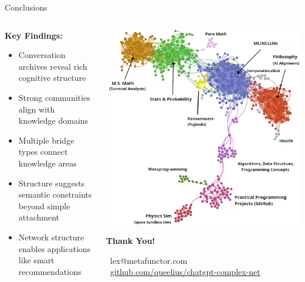 \documentclass[nodes]{beamer}
\begin{document}
\begin{frame}{Conclusions}
  \begin{columns}[T]
    \begin{column}{0.55\textwidth}
      \textbf{Key Findings:}
      \begin{itemize}
        \item Conversation archives reveal rich \alert{cognitive structure}
        \item Strong \alert{communities} align with knowledge domains
        \item Multiple \alert{bridge types} connect knowledge areas
        \item Structure suggests \alert{semantic constraints} beyond simple attachment
        \item Network structure enables applications like smart recommendations
      \end{itemize}
    \end{column}
    
    \begin{column}{0.45\textwidth}
      \begin{center}
        \includegraphics[width=0.7\linewidth]{images/cluster-vis-topics-better.png}
        \vspace{0.5cm}
        
        \textbf{Thank You!}
        \vspace{0.3cm}
        
        \scriptsize
        \faEnvelope~lex@metafunctor.com \\
        \vspace{0.1cm}
        \faGithub~\href{https://github.com/queelius/chatgpt-complex-net}{github.com/queelius/chatgpt-complex-net}
      \end{center}
    \end{column}
  \end{columns}
  

\end{frame}
\end{document}
